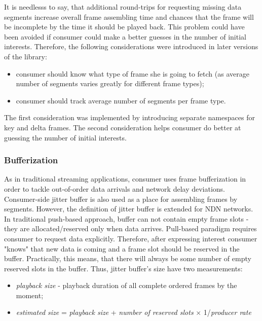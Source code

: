 \documentclass[10pt]{icn/sig-alternate-10pt} %
\begin{document}
It is needlesss to say, that additional round-trips for requesting missing data segments increase overall frame assembling time and chances that the frame will be incomplete by the time it should be played back. This problem could have been avoided if consumer could make a better guesses in the number of initial interests. Therefore, the following considerations were introduced in later versions of the library:
\begin{itemize}
\item consumer should know what type of frame she is going to fetch (as average number of segments varies greatly for different frame types);
\item consumer should track average number of segments per frame type.
\end{itemize}

The first consideration was implemented by introducing separate namespaces for key and delta frames. The second consideration helps consumer do better at guessing the number of initial interests.

\subsubsection{Bufferization}


As in traditional streaming applications, consumer uses frame bufferization in order to tackle out-of-order data arrivals and network delay deviations. Consumer-side jitter buffer is also used as a place for assembling frames by segments. However, the definition of jitter buffer is extended for NDN networks. In traditional push-based approach, buffer can not contain empty frame slots - they are allocated/reserved only when data arrives. Pull-based paradigm requires consumer to request data explicitly. Therefore, after expressing interest consumer "knows" that new data is coming and a frame slot should be reserved in the buffer. Practically, this means, that there will always be some number of empty reserved slots in the buffer. Thus, jitter buffer's size have two measurements:
\begin{itemize} 
\item \textit{playback size} - playback duration of all complete ordered frames by the moment;
\item \textit{estimated size} = \textit{playback size} + \textit{number of reserved slots} $\times$ 1/\textit{producer rate}
\end{itemize}
\end{document}
